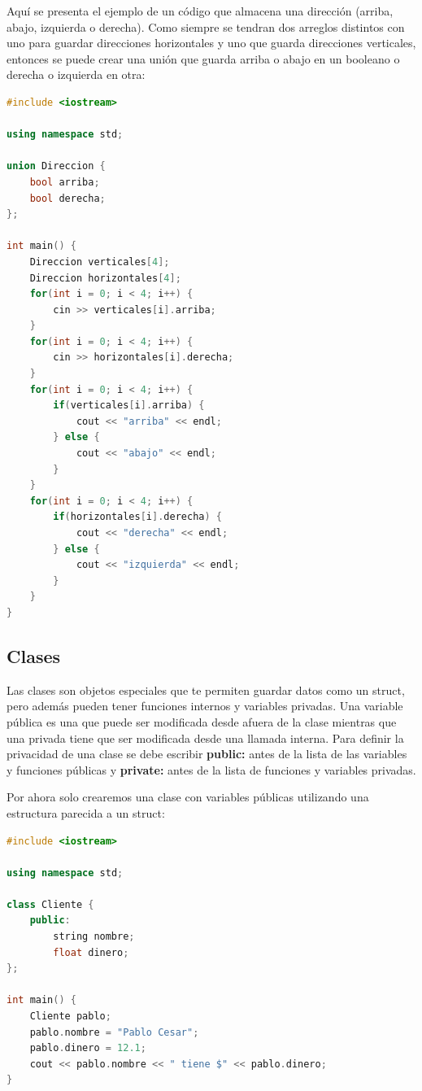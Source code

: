 \documentclass{article}
\begin{document}
Aquí se presenta el ejemplo de un código que almacena una dirección (arriba, abajo, izquierda o derecha). Como siempre se tendran dos arreglos distintos con uno para guardar direcciones horizontales y uno que guarda direcciones verticales, entonces se puede crear una unión que guarda arriba o abajo en un booleano o derecha o izquierda en otra:

\begin{lstlisting}[language=C++, title=Uniones]
#include <iostream>

using namespace std;

union Direccion {
	bool arriba;
	bool derecha;
};

int main() {
	Direccion verticales[4];
	Direccion horizontales[4];
	for(int i = 0; i < 4; i++) {
		cin >> verticales[i].arriba;
	}
	for(int i = 0; i < 4; i++) {
		cin >> horizontales[i].derecha;
	}
	for(int i = 0; i < 4; i++) {
		if(verticales[i].arriba) {
			cout << "arriba" << endl;
		} else {
			cout << "abajo" << endl;
		}
	}
	for(int i = 0; i < 4; i++) {
		if(horizontales[i].derecha) {
			cout << "derecha" << endl;
		} else {
			cout << "izquierda" << endl;
		}
	}
}
\end{lstlisting}

\subsection{Clases}

Las clases son objetos especiales que te permiten guardar datos como un struct, pero además pueden tener funciones internos y variables privadas. Una variable pública es una que puede ser modificada desde afuera de la clase mientras que una privada tiene que ser modificada desde una llamada interna. Para definir la privacidad de una clase se debe escribir \textbf{public:} antes de la lista de las variables y funciones públicas y \textbf{private:} antes de la lista de funciones y variables privadas.

Por ahora solo crearemos una clase con variables públicas utilizando una estructura parecida a un struct:

\begin{lstlisting}[language=C++, title=Declarando clases]
#include <iostream>

using namespace std;

class Cliente {
	public:
		string nombre;
		float dinero;
};

int main() {
	Cliente pablo;
	pablo.nombre = "Pablo Cesar";
	pablo.dinero = 12.1;
	cout << pablo.nombre << " tiene $" << pablo.dinero;
}
\end{lstlisting}
\end{document}
